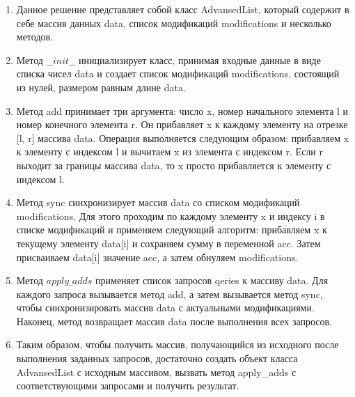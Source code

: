 \begin{enumerate}

\item Данное решение представляет собой класс AdvansedList, 
который содержит в себе массив данных data, список модификаций modifications и несколько методов.

\item Метод $\_\_init\_\_$ инициализирует класс, принимая входные данные в виде списка чисел data и создает список модификаций modifications, состоящий из нулей, размером равным длине data.

\item Метод add принимает три аргумента: число x, номер начального элемента l и номер конечного элемента r. Он прибавляет x к каждому элементу на отрезке [l, r] массива data. Операция выполняется следующим образом: прибавляем x к элементу с индексом l и вычитаем x из элемента с индексом r. Если r выходит за границы массива data, то x просто прибавляется к элементу с индексом l.

\item Метод sync синхронизирует массив data со списком модификаций modifications. Для этого проходим по каждому элементу x и индексу i в списке модификаций и применяем следующий алгоритм: прибавляем x к текущему элементу data[i] и сохраняем сумму в переменной acc. Затем присваиваем data[i] значение acc, а затем обнуляем modifications.

\item Метод $apply\_adds$ применяет список запросов qeries к массиву data. Для каждого запроса вызывается метод add, а затем вызывается метод sync, чтобы синхронизировать массив data с актуальными модификациями. Наконец, метод возвращает массив data после выполнения всех запросов.

\item Таким образом, чтобы получить массив, получающийся из исходного после выполнения заданных запросов, достаточно создать объект класса AdvansedList с исходным массивом, вызвать метод apply_adds с соответствующими запросами и получить результат.

\end{enumerate}